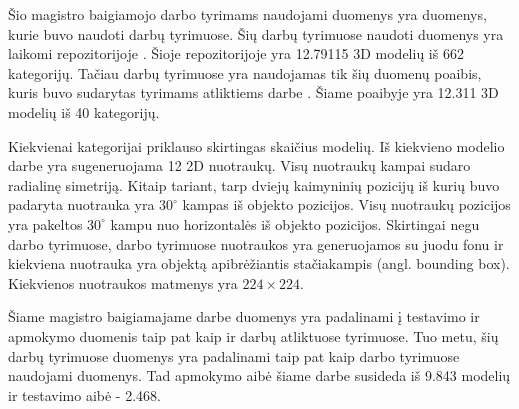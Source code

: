 Šio magistro baigiamojo darbo tyrimams naudojami duomenys yra duomenys, kurie buvo naudoti darbų \cite{cnnExp1, cnnExp2} tyrimuose. Šių darbų tyrimuose naudoti duomenys yra laikomi repozitorijoje \cite{dataRepo}. Šioje repozitorijoje yra 12.79115 3D modelių iš 662 kategorijų. Tačiau darbų \cite{cnnExp1, cnnExp2} tyrimuose yra naudojamas tik šių duomenų poaibis, kuris buvo sudarytas tyrimams atliktiems darbe \cite{dbnExp}. Šiame poaibyje yra 12.311 3D modelių iš 40 kategorijų.

Kiekvienai kategorijai priklauso skirtingas skaičius modelių. Iš kiekvieno modelio darbe \cite{cnnExp2} yra sugeneruojama 12 2D nuotraukų. Visų nuotraukų kampai sudaro radialinę simetriją. Kitaip tariant, tarp dviejų kaimyninių pozicijų iš kurių buvo padaryta nuotrauka yra $30^{\circ}$ kampas iš objekto pozicijos. Visų nuotraukų pozicijos yra pakeltos $30^{\circ}$ kampu nuo horizontalės iš objekto pozicijos. Skirtingai negu darbo \cite{dbnExp} tyrimuose, darbo \cite{cnnExp2} tyrimuose nuotraukos yra generuojamos su juodu fonu ir kiekviena nuotrauka yra objektą apibrėžiantis stačiakampis (angl. bounding box). Kiekvienos nuotraukos matmenys yra $224\times224$.

Šiame magistro baigiamajame darbe duomenys yra padalinami į testavimo ir apmokymo duomenis taip pat kaip ir darbų \cite{cnnExp1, cnnExp2} atliktuose tyrimuose. Tuo metu, šių darbų tyrimuose duomenys yra padalinami taip pat kaip darbo \cite{dbnExp} tyrimuose naudojami duomenys. Tad apmokymo aibė šiame darbe susideda iš 9.843 modelių ir testavimo aibė - 2.468.

